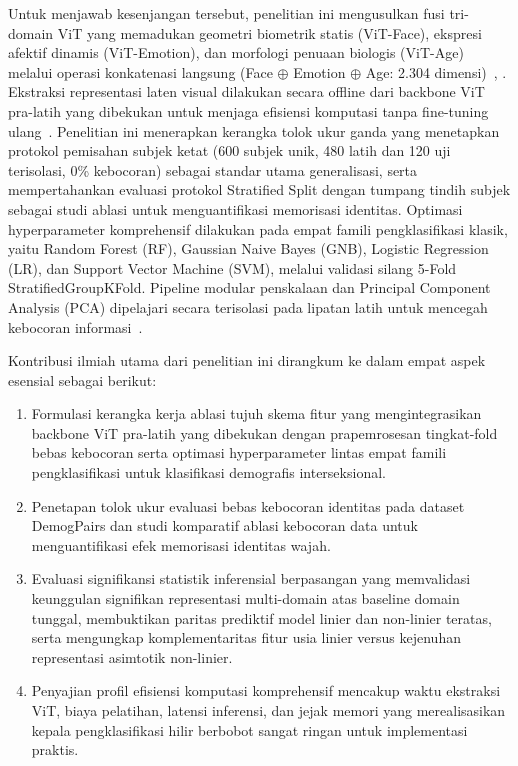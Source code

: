 Untuk menjawab kesenjangan tersebut, penelitian ini mengusulkan fusi tri-domain ViT yang memadukan geometri biometrik statis (ViT-Face), ekspresi afektif dinamis (ViT-Emotion), dan morfologi penuaan biologis (ViT-Age) melalui operasi konkatenasi langsung (Face $\oplus$ Emotion $\oplus$ Age: 2.304 dimensi)~\cite{ref21}, \cite{ref22}. Ekstraksi representasi laten visual dilakukan secara offline dari backbone ViT pra-latih yang dibekukan untuk menjaga efisiensi komputasi tanpa fine-tuning ulang~\cite{ref23}. Penelitian ini menerapkan kerangka tolok ukur ganda yang menetapkan protokol pemisahan subjek ketat (600 subjek unik, 480 latih dan 120 uji terisolasi, 0\% kebocoran) sebagai standar utama generalisasi, serta mempertahankan evaluasi protokol Stratified Split dengan tumpang tindih subjek sebagai studi ablasi untuk menguantifikasi memorisasi identitas. Optimasi hyperparameter komprehensif dilakukan pada empat famili pengklasifikasi klasik, yaitu Random Forest (RF), Gaussian Naive Bayes (GNB), Logistic Regression (LR), dan Support Vector Machine (SVM), melalui validasi silang 5-Fold StratifiedGroupKFold. Pipeline modular penskalaan dan Principal Component Analysis (PCA) dipelajari secara terisolasi pada lipatan latih untuk mencegah kebocoran informasi~\cite{ref24}.

Kontribusi ilmiah utama dari penelitian ini dirangkum ke dalam empat aspek esensial sebagai berikut:
\begin{enumerate}
\item Formulasi kerangka kerja ablasi tujuh skema fitur yang mengintegrasikan backbone ViT pra-latih yang dibekukan dengan prapemrosesan tingkat-fold bebas kebocoran serta optimasi hyperparameter lintas empat famili pengklasifikasi untuk klasifikasi demografis interseksional.
\item Penetapan tolok ukur evaluasi bebas kebocoran identitas pada dataset DemogPairs dan studi komparatif ablasi kebocoran data untuk menguantifikasi efek memorisasi identitas wajah.
\item Evaluasi signifikansi statistik inferensial berpasangan yang memvalidasi keunggulan signifikan representasi multi-domain atas baseline domain tunggal, membuktikan paritas prediktif model linier dan non-linier teratas, serta mengungkap komplementaritas fitur usia linier versus kejenuhan representasi asimtotik non-linier.
\item Penyajian profil efisiensi komputasi komprehensif mencakup waktu ekstraksi ViT, biaya pelatihan, latensi inferensi, dan jejak memori yang merealisasikan kepala pengklasifikasi hilir berbobot sangat ringan untuk implementasi praktis.
\end{enumerate}

